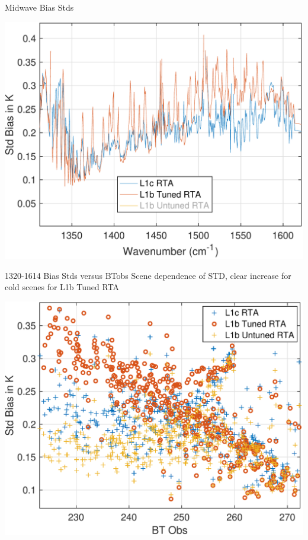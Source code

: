 \documentclass[10pt,t]{beamer}
\begin{document}
\begin{frame}[label={sec:org916b712}]{Midwave Bias Stds}
\addtocounter{framenumber}{-1}
  \begin{center}
\includegraphics[width=0.75\linewidth]{./Talk2/std_3rta_mw_nol1b untuned.pdf}
\end{center}
\end{frame}

\begin{frame}[label={sec:org8aa77db}]{1320-1614 \wn Bias Stds versus BTobs}
Scene dependence of STD, clear increase for cold scenes for L1b Tuned RTA
\begin{center}
\includegraphics[width=0.75\linewidth]{./Talk2/std_vs_btobs_1320-1614.pdf}
\end{center}
\end{frame}
\end{document}
